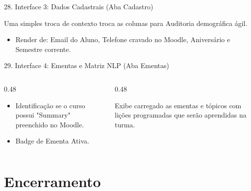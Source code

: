 \documentclass[10pt, aspectratio=169]{beamer}
\begin{document}
\begin{frame}{28. Interface 3: Dados Cadastrais (Aba Cadastro)}
    \begin{tcolorbox}[enhanced,title=Modulação de Grid Dinâmico,colback=black!30,colframe=ArkosGreen,fonttitle=\bfseries]
        Uma simples troca de contexto troca as colunas para Auditoria demográfica ágil.
    \end{tcolorbox}
    \vspace{0.2cm}
    \begin{itemize}
        \item Render de: Email do Aluno, Telefone cravado no Moodle, Aniversário e Semestre corrente.
    \end{itemize}
\end{frame}

\begin{frame}{29. Interface 4: Ementas e Matriz NLP (Aba Ementas)}
    \begin{columns}[onlytextwidth]
        \begin{column}{0.48\textwidth}
            \begin{tcolorbox}[enhanced,title=Grid de Ementas,colback=black!30,colframe=ArkosGreen,fonttitle=\bfseries]
                \begin{itemize}
                    \item Identificação se o curso possui "Summary" preenchido no Moodle.
                    \item Badge de Ementa Ativa.
                \end{itemize}
            \end{tcolorbox}
        \end{column}
        \begin{column}{0.48\textwidth}
            \begin{tcolorbox}[enhanced,title=Popup Modal Seções,colback=black!30,colframe=cyan,fonttitle=\bfseries]
                Exibe carregado as ementas e tópicos com lições programadas que serão aprendidas na turma.
            \end{tcolorbox}
        \end{column}
    \end{columns}
\end{frame}

\section{Encerramento}
\end{document}
